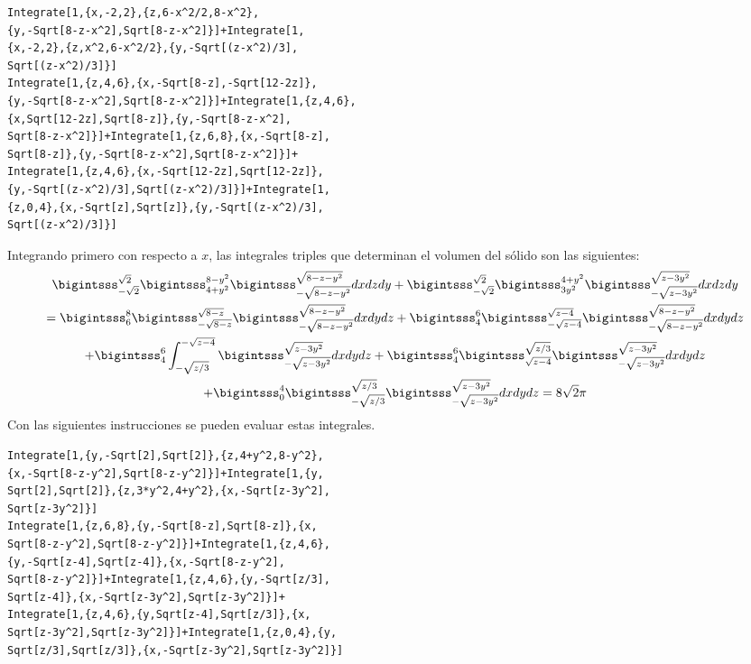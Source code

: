 \begin{tcolorbox}[title=\bf Instrucción en \verb"Mathematica"]\begin{Verbatim}[formatcom=\letraverbatim]
Integrate[1,{x,-2,2},{z,6-x^2/2,8-x^2},
{y,-Sqrt[8-z-x^2],Sqrt[8-z-x^2]}]+Integrate[1,
{x,-2,2},{z,x^2,6-x^2/2},{y,-Sqrt[(z-x^2)/3],
Sqrt[(z-x^2)/3]}]
Integrate[1,{z,4,6},{x,-Sqrt[8-z],-Sqrt[12-2z]},
{y,-Sqrt[8-z-x^2],Sqrt[8-z-x^2]}]+Integrate[1,{z,4,6},
{x,Sqrt[12-2z],Sqrt[8-z]},{y,-Sqrt[8-z-x^2],
Sqrt[8-z-x^2]}]+Integrate[1,{z,6,8},{x,-Sqrt[8-z],
Sqrt[8-z]},{y,-Sqrt[8-z-x^2],Sqrt[8-z-x^2]}]+
Integrate[1,{z,4,6},{x,-Sqrt[12-2z],Sqrt[12-2z]},
{y,-Sqrt[(z-x^2)/3],Sqrt[(z-x^2)/3]}]+Integrate[1,
{z,0,4},{x,-Sqrt[z],Sqrt[z]},{y,-Sqrt[(z-x^2)/3],
Sqrt[(z-x^2)/3]}]
\end{Verbatim}
\end{tcolorbox}

Integrando primero con respecto a $x$, las integrales triples que determinan el volumen del sólido son las siguientes:
{\footnotesize
\begin{multline} \bi_{-\sqrt{2}}^{\sqrt{2}}\bi_{4+y^2 }^{8-y^2}\bi_{-\sqrt{8-z-y^2}}^{\sqrt{8-z-y^2}}dxdzdy
+\bi_{-\sqrt{2}}^{\sqrt{2}}\bi_{3y^2 }^{4+y^2}\bi_{-\sqrt{z-3y^2 } }^{\sqrt{z-3y^2}}dxdzdy\\
= \bi_{6}^{8}\bi_{-\sqrt{8-z}}^{\sqrt{8-z}}\bi_{-\sqrt{8-z-y^2 }}^{\sqrt{8-z-y^2}}dxdydz+\bi_{4}^{6}\bi_{-\sqrt{z-4}}^{\sqrt{z-4}}\bi_{-\sqrt{8-z-y^2}}^{\sqrt{8-z-y^2 }}dxdydz \\
+\bi_{4}^{6}\int_{-\sqrt{z/3}}^{-\sqrt{z-4}}\bi_{-\sqrt{z-3y^2}}^{\sqrt{z-3y^2}}dxdydz+\bi_{4}^{6}\bi_{\sqrt{z-4}}^{\sqrt{z/3}}\bi_{-\sqrt{z-3y^2}}^{\sqrt{z-3y^2 }}dxdydz \\
+\bi_{0}^{4}\bi_{-\sqrt{z/3}}^{\sqrt{z/3}}\bi_{-\sqrt{z-3y^2 }}^{\sqrt{z-3y^2 } }dxdydz = 8\sqrt{2}\pi
\end{multline}
}
Con las siguientes instrucciones se pueden evaluar estas integrales.

\begin{tcolorbox}[title=\bf Instrucción en \verb"Mathematica"]\begin{Verbatim}[formatcom=\letraverbatim]
Integrate[1,{y,-Sqrt[2],Sqrt[2]},{z,4+y^2,8-y^2},
{x,-Sqrt[8-z-y^2],Sqrt[8-z-y^2]}]+Integrate[1,{y,
Sqrt[2],Sqrt[2]},{z,3*y^2,4+y^2},{x,-Sqrt[z-3y^2],
Sqrt[z-3y^2]}]
Integrate[1,{z,6,8},{y,-Sqrt[8-z],Sqrt[8-z]},{x,
Sqrt[8-z-y^2],Sqrt[8-z-y^2]}]+Integrate[1,{z,4,6},
{y,-Sqrt[z-4],Sqrt[z-4]},{x,-Sqrt[8-z-y^2],
Sqrt[8-z-y^2]}]+Integrate[1,{z,4,6},{y,-Sqrt[z/3],
Sqrt[z-4]},{x,-Sqrt[z-3y^2],Sqrt[z-3y^2]}]+
Integrate[1,{z,4,6},{y,Sqrt[z-4],Sqrt[z/3]},{x,
Sqrt[z-3y^2],Sqrt[z-3y^2]}]+Integrate[1,{z,0,4},{y,
Sqrt[z/3],Sqrt[z/3]},{x,-Sqrt[z-3y^2],Sqrt[z-3y^2]}]
\end{Verbatim}
\end{tcolorbox}


